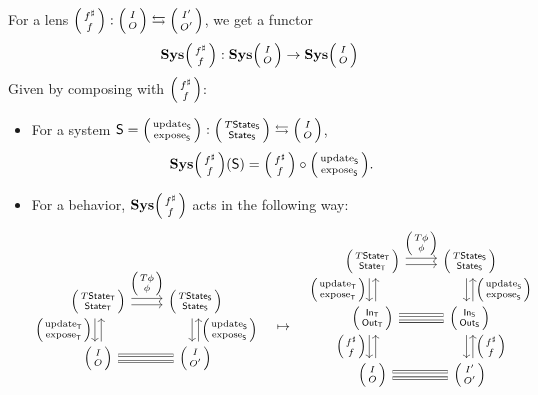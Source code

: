 \documentclass[DynamicalBook]{subfiles}
\begin{document}
\begin{proposition}\label{prop.lens_comp_functor_discrete}
  For a lens $\lens{f^{\sharp}}{f} : \lens{I}{O} \leftrightarrows
  \lens{I'}{O'}$, we get a functor
  $$\Cat{Sys}\lens{f^\sharp}{f} : \Cat{Sys}\lens{I}{O} \to
  \Cat{Sys}\lens{I}{O}$$
  Given by composing with $\lens{f^\sharp}{f}$:
  \begin{itemize}
    \item For a system $\Sys{S} = \lens{\update{S}}{\expose{S}} :
      \lens{T\State{S}}{\State{S}}\fromto \lens{I}{O}$,
      $$\Cat{Sys}\lens{f^{\sharp}}{f}(\Sys{S}) = \lens{f^{\sharp}}{f} \circ \lens{\update{S}}{\expose{S}}.$$
    \item For a behavior, $\Cat{Sys}\lens{f^{\sharp}}{f}$ acts in the following way:
      \[
  \begin{tikzcd}
    \lens{T\State{T}}{\State{T}} \ar[r, shift left, "\lens{T\phi}{\phi}"] \ar[r, shift right] \ar[d, shift right,
    "\lens{\update{T}}{\expose{T}}"'] \ar[d, shift left, leftarrow] &
    \lens{T\State{S}}{\State{S}} \ar[d, shift left, leftarrow,
    "\lens{\update{S}}{\expose{S}}"] \ar[d, shift right]\\
    \lens{I}{O} \ar[r, shift right, equals]
    \ar[r, shift left, equals] & \lens{I}{O'}
  \end{tikzcd} \quad \mapsto \quad
  \begin{tikzcd}
    \lens{T\State{T}}{\State{T}} \ar[r, shift left, "\lens{T\phi}{\phi}"] \ar[r, shift right] \ar[d, shift right,
    "\lens{\update{T}}{\expose{T}}"'] \ar[d, shift left, leftarrow] &
    \lens{T\State{S}}{\State{S}} \ar[d, shift left, leftarrow,
    "\lens{\update{S}}{\expose{S}}"] \ar[d, shift right]\\
    \lens{\In{T}}{\Out{T}} \ar[d, shift right, "\lens{f^{\sharp}}{f}"'] \ar[d, shift left,
        leftarrow] \ar[r, shift right, equals]
    \ar[r, shift left, equals] & \lens{\In{S}}{\Out{S}} \ar[d, shift left, leftarrow,
        "\lens{f^{\sharp}}{f}"] \ar[d, shift right]\\
    \lens{I}{O} \ar[r, shift right, equals]
    \ar[r, shift left, equals] & \lens{I'}{O'} \\
  \end{tikzcd} 
      \]
  \end{itemize}
\end{proposition}
\end{document}
